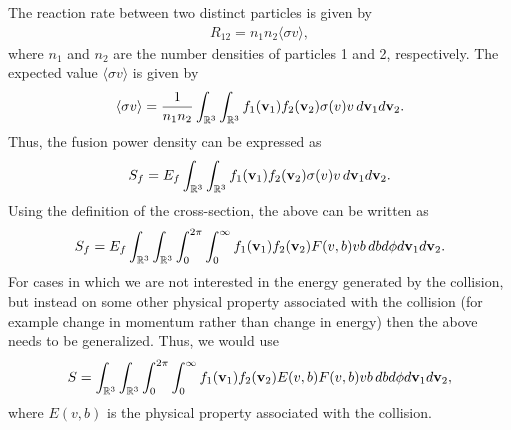 \documentclass[a4paper,11pt]{report}
\begin{document}
The reaction rate between two distinct particles is given by
\begin{align}
    R_{12} = n_1 n_2 \langle \sigma v \rangle,
\end{align}
where $n_1$ and $n_2$ are the number densities of particles 1 and 2, respectively. The expected value $\langle \sigma v \rangle$ is given by
\begin{equation}
    \langle \sigma v \rangle = \frac{1}{n_1 n_2} \int_{\mathbb{R}^3} \int_{\mathbb{R}^3} f_1(\mathbf{v}_1) f_2(\mathbf{v}_2) \sigma(v) v \, d\mathbf{v}_1 d\mathbf{v}_2.
\end{equation}
Thus, the fusion power density can be expressed as
\begin{equation}
    S_f = E_f \int_{\mathbb{R}^3} \int_{\mathbb{R}^3} f_1(\mathbf{v}_1) f_2(\mathbf{v}_2) \sigma(v) v \, d\mathbf{v}_1 d\mathbf{v}_2.
\end{equation}
Using the definition of the cross-section, the above can be written as
\begin{equation}
    S_f = E_f \int_{\mathbb{R}^3} \int_{\mathbb{R}^3} \int_0^{2\pi} \int_0^\infty f_1(\mathbf{v}_1) f_2(\mathbf{v}_2) F(v,b) v b \, db d\phi d\mathbf{v}_1 d\mathbf{v}_2.
\end{equation}
For cases in which we are not interested in the energy generated by the collision, but instead on some other physical property associated with the collision (for example change in momentum rather than change in energy) then the above needs to be generalized. Thus, we would use
\begin{equation}
    S = \int_{\mathbb{R}^3} \int_{\mathbb{R}^3} \int_0^{2\pi} \int_0^\infty f_1(\mathbf{v}_1) f_2(\mathbf{v}_2) E(v,b) F(v,b) v b \, db d\phi d\mathbf{v}_1 d\mathbf{v}_2,
\end{equation}
where $E(v,b)$ is the physical property associated with the collision.



\end{document}
